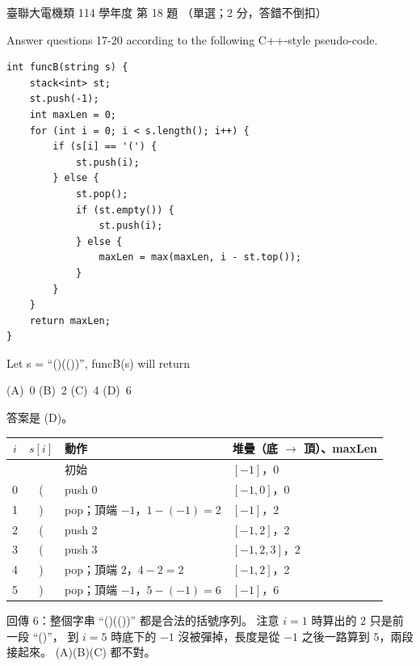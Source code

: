 \begin{pastexam}[label={px:ust-114-ee-ds-18}]{臺聯大電機類 114 學年度 第 18 題}
（單選；2 分，答錯不倒扣）

Answer questions 17-20 according to the following C++-style pseudo-code.
\begin{verbatim}
int funcB(string s) {
    stack<int> st;
    st.push(-1);
    int maxLen = 0;
    for (int i = 0; i < s.length(); i++) {
        if (s[i] == '(') {
            st.push(i);
        } else {
            st.pop();
            if (st.empty()) {
                st.push(i);
            } else {
                maxLen = max(maxLen, i - st.top());
            }
        }
    }
    return maxLen;
}
\end{verbatim}

Let s = ``()(())'', funcB(s) will return

(A)~0 \qquad (B)~2 \qquad (C)~4 \qquad (D)~6
\end{pastexam}

\begin{pastsoln}
答案是 (D)。

\begin{center}
\small
\begin{tabular}{ccll}
\toprule
$i$ & $s[i]$ & 動作 & 堆疊（底 $\to$ 頂）、maxLen \\
\midrule
 & & 初始 & $[-1]$，0 \\
0 & ( & push 0 & $[-1, 0]$，0 \\
1 & ) & pop；頂端 $-1$，$1 - (-1) = 2$ & $[-1]$，2 \\
2 & ( & push 2 & $[-1, 2]$，2 \\
3 & ( & push 3 & $[-1, 2, 3]$，2 \\
4 & ) & pop；頂端 $2$，$4 - 2 = 2$ & $[-1, 2]$，2 \\
5 & ) & pop；頂端 $-1$，$5 - (-1) = 6$ & $[-1]$，6 \\
\bottomrule
\end{tabular}
\end{center}
回傳 $6$：整個字串 ``()(())'' 都是合法的括號序列。 注意 $i = 1$ 時算出的 $2$ 只是前一段 ``()''，
到 $i = 5$ 時底下的 $-1$ 沒被彈掉，長度是從 $-1$ 之後一路算到 $5$，兩段接起來。 (A)(B)(C) 都不對。
\end{pastsoln}
